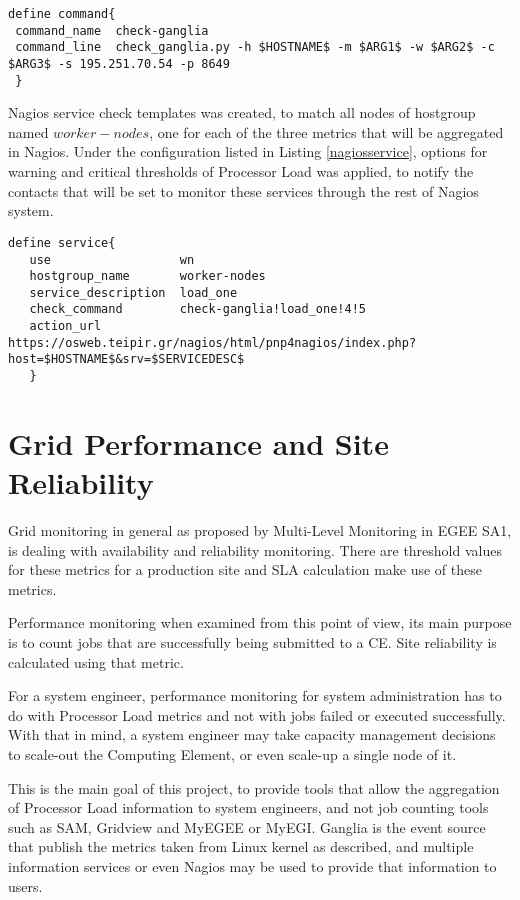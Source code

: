 \begin{lstlisting}[label=checkganglia]
define command{
 command_name  check-ganglia
 command_line  check_ganglia.py -h $HOSTNAME$ -m $ARG1$ -w $ARG2$ -c $ARG3$ -s 195.251.70.54 -p 8649
 }
\end{lstlisting}

Nagios service check templates was created, to match all nodes of hostgroup named $worker-nodes$, one for each of the three metrics that will be aggregated in Nagios. Under the configuration listed in Listing \ref{nagiosservice}, options for warning and critical thresholds of Processor Load was applied, to notify the contacts that will be set to monitor these services through the rest of Nagios system.

\begin{lstlisting}[label=nagiosservice]
define service{
   use                  wn
   hostgroup_name       worker-nodes
   service_description  load_one
   check_command        check-ganglia!load_one!4!5
   action_url           https://osweb.teipir.gr/nagios/html/pnp4nagios/index.php?host=$HOSTNAME$&srv=$SERVICEDESC$
   }
\end{lstlisting}

\section{Grid Performance and Site Reliability}

Grid monitoring in general as proposed by Multi-Level Monitoring in EGEE SA1, is dealing with availability and reliability monitoring. There are threshold values for these metrics for a production site and SLA calculation make use of these metrics.

Performance monitoring when examined from this point of view, its main purpose is to count jobs that are successfully being submitted to a CE. Site reliability is calculated using that metric.

For a system engineer, performance monitoring for system administration has to do with Processor Load metrics and not with jobs failed or executed successfully. With that in mind, a system engineer may take capacity management decisions to scale-out the Computing Element, or even scale-up a single node of it.

This is the main goal of this project, to provide tools that allow the aggregation of Processor Load information to system engineers, and not job counting tools such as SAM, Gridview and MyEGEE or MyEGI. Ganglia is the event source that publish the metrics taken from Linux kernel as described, and multiple information services or even Nagios may be used to provide that information to users.

